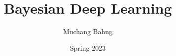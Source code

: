 \documentclass{article}
\begin{document}

\title{Bayesian Deep Learning}
\author{Muchang Bahng}
\date{Spring 2023}

\maketitle
\tableofcontents
\pagebreak 






\end{document}
